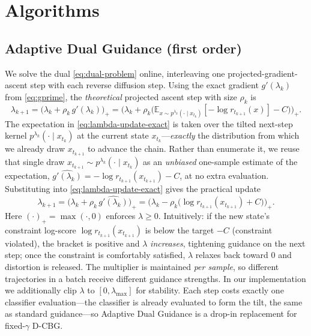 \documentclass{article}
\newcommand{\E}{\mathbb{E}}
\begin{document}
\section{Algorithms}
\label{sec:algorithms}

\subsection{Adaptive Dual Guidance (first order)}
We solve the dual \eqref{eq:dual-problem} online, interleaving one projected-gradient-ascent step with each reverse diffusion step. Using the exact gradient $g'(\lambda_k)$ from \eqref{eq:gprime}, the \emph{theoretical} projected ascent step with size $\rho_k$ is
\begin{equation}
\label{eq:lambda-update-exact}
\lambda_{k+1}=\big(\lambda_k+\rho_k\,g'(\lambda_k)\big)_{+}
=\Big(\lambda_k+\rho_k\big(\E_{x\sim p^{\lambda_k}(\cdot\mid x_{t_k})}[-\log r_{t_{k+1}}(x)]-C\big)\Big)_{+}.
\end{equation}
The expectation in \eqref{eq:lambda-update-exact} is taken over the tilted next-step kernel $p^{\lambda_k}(\cdot\mid x_{t_k})$ at the current state $x_{t_k}$---\emph{exactly} the distribution from which we already draw $x_{t_{k+1}}$ to advance the chain. Rather than enumerate it, we reuse that single draw $x_{t_{k+1}}\sim p^{\lambda_k}(\cdot\mid x_{t_k})$ as an \emph{unbiased} one-sample estimate of the expectation, $\widehat{g'(\lambda_k)}=-\log r_{t_{k+1}}(x_{t_{k+1}})-C$, at no extra evaluation. Substituting into \eqref{eq:lambda-update-exact} gives the practical update
\begin{equation}
\label{eq:lambda-update}
\lambda_{k+1}=\Big(\lambda_k+\rho_k\,\widehat{g'(\lambda_k)}\Big)_{+}
=\Big(\lambda_k-\rho_k\big(\log r_{t_{k+1}}(x_{t_{k+1}})+C\big)\Big)_{+}.
\end{equation}
Here $(\cdot)_+=\max(\cdot,0)$ enforces $\lambda\ge0$. Intuitively: if the new state's constraint log-score $\log r_{t_{k+1}}(x_{t_{k+1}})$ is below the target $-C$ (constraint violated), the bracket is positive and $\lambda$ \emph{increases}, tightening guidance on the next step; once the constraint is comfortably satisfied, $\lambda$ relaxes back toward $0$ and distortion is released. The multiplier is maintained \emph{per sample}, so different trajectories in a batch receive different guidance strengths. In our implementation we additionally clip $\lambda$ to $[0,\lambda_{\max}]$ for stability. Each step costs exactly one classifier evaluation---the classifier is already evaluated to form the tilt, the same as standard guidance---so Adaptive Dual Guidance is a drop-in replacement for fixed-$\gamma$ D-CBG.
\end{document}
